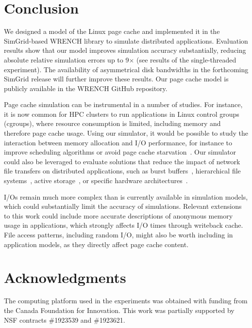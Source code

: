 \documentclass[conference]{IEEEtran}
\newcommand{\simgrid}{SimGrid\xspace}
\newcommand{\wrench}{WRENCH\xspace}
\begin{document}
    \section{Conclusion}
    \label{discussion}
    We designed a model of the Linux page cache and implemented it in the
    \simgrid-based \wrench library to simulate distributed applications.
    Evaluation results show that our model improves simulation accuracy
    substantially, reducing absolute relative simulation errors up to
    9$\times$ (see results of the single-threaded experiment). The
    availability of asymmetrical disk bandwidths in the forthcoming
    \simgrid release will further improve these results.
    Our page cache model is publicly available in the \wrench GitHub
    repository.

    Page cache simulation can be instrumental in a number of studies. For
    instance, it is now common for HPC clusters to run applications in
    Linux control groups (cgroups), where resource consumption is limited,
    including memory and therefore page cache usage. Using our simulator,
    it would be possible to study the interaction between memory allocation
    and I/O performance, for instance to improve scheduling algorithms or
    avoid page cache starvation~\cite{zhuang2017}. Our simulator could also
    be leveraged to evaluate solutions that reduce the impact of network
    file transfers on distributed applications, such as burst
    buffers~\cite{ferreiradasilva-fgcs-bb-2019}, hierarchical file
    systems~\cite{islam2015triple}, active storage~\cite{5496981}, or
    specific hardware architectures~\cite{hayot2020performance}. 

    I/Os remain much more complex than is currently available in
    simulation models, which could substantially limit the accuracy of simulations.
    Relevant extensions to this work could include more
    accurate descriptions of anonymous memory usage in applications, 
    which strongly affects I/O times through writeback cache. File access patterns, 
    including random I/O, might also be worth including in application models,
    as they directly affect page cache content.

        \section{Acknowledgments}
The computing platform used in the experiments was obtained with funding
from the Canada Foundation for Innovation. This work was partially supported
by NSF contracts \#1923539 and \#1923621.



\end{document}

